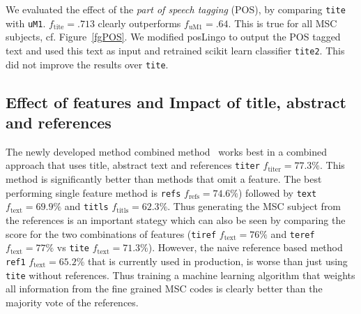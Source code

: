 We evaluated the effect of the \emph{part of speech tagging} (POS), by comparing \texttt{tite} with \texttt{uM1}. $f_\mathrm{tite}=.713$ clearly outperforms $f_\mathrm{uM1}=.64.$ This is true for all MSC subjects, cf. Figure~\ref{fgPOS}. We modified posLingo to output the POS tagged text and used this text as input and retrained scikit learn classifier \texttt{tite2}. This did not improve the results over \texttt{tite}.

\subsection{Effect of features and Impact of title, abstract and references}
The newly developed method combined method~\cite{Scharpf2020} works best in a combined approach that uses title, abstract text and references \texttt{titer} $f_\mathrm{titer}=77.3\%.$
This method is significantly better than methods that omit a feature.
The best performing single feature method is \texttt{refs} $f_\mathrm{refs}=74.6\%$) followed by \texttt{text} $f_\mathrm{text}=69.9\%$ and \texttt{titls} $f_\mathrm{titls}=62.3\%$.
Thus generating the MSC subject from the references is an important stategy which can also be seen by comparing the score for the two combinations of features (\texttt{tiref} $f_\mathrm{text}=76\%$ and \texttt{teref} $f_\mathrm{text}=77\%$ vs \texttt{tite} $f_\mathrm{text}=71.3\%$).
However, the naive reference based method \texttt{ref1} $f_\mathrm{text}=65.2\%$ that is currently used in production, is worse than just using \texttt{tite} without references.
Thus training a machine learning algorithm that weights all information from the fine grained MSC codes is clearly better than the majority vote of the references.


